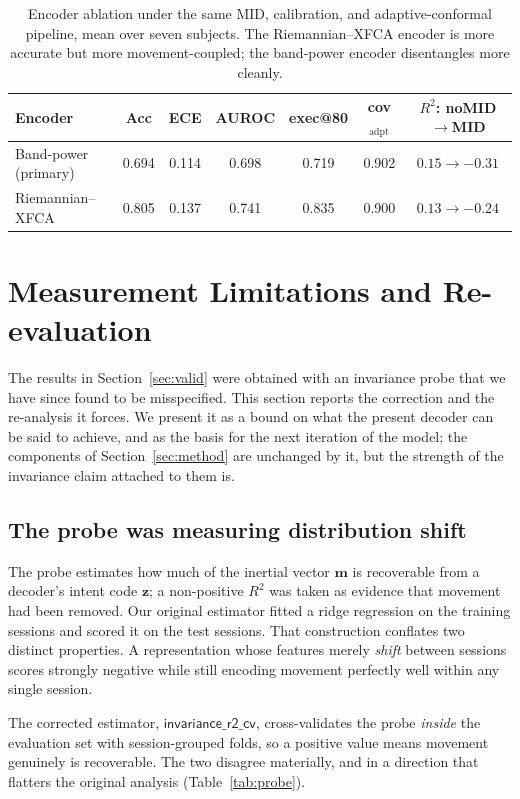 \documentclass[conference]{IEEEtran}
\begin{document}
\begin{table}[t]
\caption{Encoder ablation under the same MID, calibration, and adaptive-conformal
pipeline, mean over seven subjects. The Riemannian--XFCA encoder is more accurate but
more movement-coupled; the band-power encoder disentangles more cleanly.}
\label{tab:enc}
\centering
\begin{tabular}{lcccccc}
\toprule
Encoder & Acc & ECE & AUROC & exec@80 & cov$_{\text{adpt}}$ & $R^2$: noMID$\rightarrow$MID \\
\midrule
Band-power (primary) & 0.694 & 0.114 & 0.698 & 0.719 & 0.902 & $0.15\rightarrow-0.31$ \\
Riemannian--XFCA & 0.805 & 0.137 & 0.741 & 0.835 & 0.900 & $0.13\rightarrow-0.24$ \\
\bottomrule
\end{tabular}
\end{table}


\section{Measurement Limitations and Re-evaluation}\label{sec:reeval}

The results in Section~\ref{sec:valid} were obtained with an invariance probe that we
have since found to be misspecified. This section reports the correction and the
re-analysis it forces. We present it as a bound on what the present decoder can be said
to achieve, and as the basis for the next iteration of the model; the components of
Section~\ref{sec:method} are unchanged by it, but the strength of the invariance claim
attached to them is.

\subsection{The probe was measuring distribution shift}\label{sec:probe}

The probe estimates how much of the inertial vector $\mathbf{m}$ is recoverable from a
decoder's intent code $\mathbf{z}$; a non-positive $R^2$ was taken as evidence that
movement had been removed. Our original estimator fitted a ridge regression on the
training sessions and scored it on the test sessions. That construction conflates two
distinct properties. A representation whose features merely \emph{shift} between
sessions scores strongly negative while still encoding movement perfectly well within
any single session.

The corrected estimator, $\textsf{invariance\_r2\_cv}$, cross-validates the probe
\emph{inside} the evaluation set with session-grouped folds, so a positive value means
movement genuinely is recoverable. The two disagree materially, and in a direction that
flatters the original analysis (Table~\ref{tab:probe}).
\end{document}
